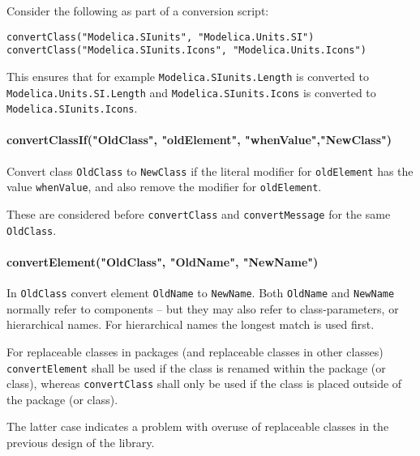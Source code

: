 \begin{example}
Consider the following as part of a conversion script:
\begin{lstlisting}[language=modelica]
convertClass("Modelica.SIunits", "Modelica.Units.SI")
convertClass("Modelica.SIunits.Icons", "Modelica.Units.Icons")
\end{lstlisting}
This ensures that for example \lstinline!Modelica.SIunits.Length! is converted to \lstinline!Modelica.Units.SI.Length!
and \lstinline!Modelica.SIunits.Icons! is converted to \lstinline!Modelica.SIunits.Icons!.
\end{example}
\paragraph*{convertClassIf("OldClass", "oldElement", "whenValue","NewClass")}

Convert class \lstinline!OldClass! to \lstinline!NewClass! if the literal modifier for
\lstinline!oldElement! has the value \lstinline!whenValue!, and also remove the modifier for
\lstinline!oldElement!.

These are considered before \lstinline!convertClass! and \lstinline!convertMessage! for the same
\lstinline!OldClass!.

\paragraph*{convertElement("OldClass", "OldName", "NewName")}

In \lstinline!OldClass! convert element \lstinline!OldName! to \lstinline!NewName!.
Both \lstinline!OldName! and \lstinline!NewName!
normally refer to components -- but they may also refer to
class-parameters, or hierarchical names. For hierarchical names the
longest match is used first.

For replaceable classes in packages (and replaceable classes in other classes) \lstinline!convertElement! shall
be used if the class is renamed within the package (or class), whereas \lstinline!convertClass! shall only be used if the class
is placed outside of the package (or class).
\begin{nonnormative}
The latter case indicates a problem with overuse of replaceable classes in the previous design of the library.
\end{nonnormative}

